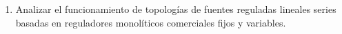 \begin{enumerate}
    \item Analizar el funcionamiento de topologías de fuentes reguladas lineales series basadas en reguladores monolíticos comerciales fijos y variables.
\end{enumerate}
